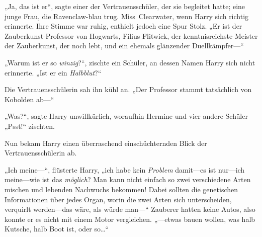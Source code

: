 „Ja, das ist er“, sagte einer der Vertrauensschüler, der sie begleitet hatte; eine junge Frau, die Ravenclaw-blau trug. Miss~Clearwater, wenn Harry sich richtig erinnerte. Ihre Stimme war ruhig, enthielt jedoch eine Spur Stolz.
„Er ist der Zauberkunst-Professor von Hogwarts, Filius Flitwick, der kenntnisreichste Meister der Zauberkunst, der noch lebt, und ein ehemals glänzender Duellkämpfer—“




„Warum ist er so \emph{winzig}?“, zischte ein Schüler, an dessen Namen Harry sich nicht erinnerte.
„Ist er ein \emph{Halbblut}?“

Die Vertrauensschülerin sah ihn kühl an.
„Der Professor stammt tatsächlich von Kobolden ab—“

„Was?“, sagte Harry unwillkürlich, woraufhin Hermine und vier andere Schüler
„Psst!“ zischten.

Nun bekam Harry einen überraschend einschüchternden Blick der Vertrauensschülerin ab.

„Ich meine—“, flüsterte Harry, „ich habe kein \emph{Problem} damit—es ist nur—ich meine—wie ist das \emph{möglich}? Man kann nicht einfach so zwei verschiedene Arten mischen und lebenden Nachwuchs bekommen! Dabei sollten die genetischen Informationen über jedes Organ, worin die zwei Arten sich unterscheiden, verquirlt werden—das wäre, als würde man—“ Zauberer hatten keine Autos, also konnte er es nicht mit einem Motor vergleichen. „—etwas bauen wollen, was halb Kutsche, halb Boot ist, oder so…“

